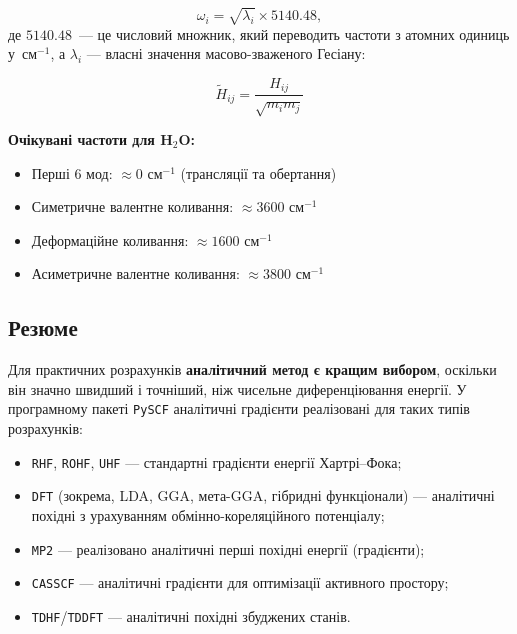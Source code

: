 \begin{equation}
    \omega_i = \sqrt{\lambda_i} \times 5140.48,
\end{equation}
де $5140.48$~--- це числовий множник, який переводить частоти з атомних одиниць у~см$^{-1}$, а $\lambda_i$ --- власні значення масово-зваженого Гесіану:

\begin{equation}
    \tilde{H}_{ij} = \frac{H_{ij}}{\sqrt{m_i m_j}}
\end{equation}

\noindent\textbf{Очікувані частоти для H$_2$O:}
\begin{itemize}
    \item Перші 6 мод: $\approx 0$ см$^{-1}$ (трансляції та обертання)
    \item Симетричне валентне коливання: $\approx 3600$ см$^{-1}$
    \item Деформаційне коливання: $\approx 1600$ см$^{-1}$
    \item Асиметричне валентне коливання: $\approx 3800$ см$^{-1}$
\end{itemize}


\subsection{Резюме}

Для практичних розрахунків \textbf{аналітичний метод є кращим вибором}, оскільки він значно швидший і точніший, ніж чисельне диференціювання енергії.
У програмному пакеті \texttt{PySCF} аналітичні градієнти реалізовані для таких типів розрахунків:

\begin{itemize}
    \item \texttt{RHF}, \texttt{ROHF}, \texttt{UHF} --- стандартні градієнти енергії Хартрі–Фока;
    \item \texttt{DFT} (зокрема, LDA, GGA, мета-GGA, гібридні функціонали) --- аналітичні похідні з урахуванням обмінно-кореляційного потенціалу;
    \item \texttt{MP2} --- реалізовано аналітичні перші похідні енергії (градієнти);
    \item \texttt{CASSCF} --- аналітичні градієнти для оптимізації активного простору;
    \item \texttt{TDHF}/\texttt{TDDFT} --- аналітичні похідні збуджених станів.
\end{itemize}

